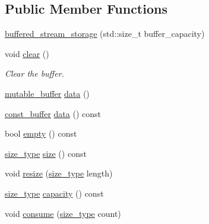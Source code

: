 \subsection*{Public Member Functions}
\begin{DoxyCompactItemize}
\item 
\hyperlink{classasio_1_1detail_1_1buffered__stream__storage_a8cfe52167d4f4ec4585f7e88debed158}{buffered\+\_\+stream\+\_\+storage} (std\+::size\+\_\+t buffer\+\_\+capacity)
\item 
void \hyperlink{classasio_1_1detail_1_1buffered__stream__storage_a5acab63f1e2af9413551a10674c68bae}{clear} ()
\begin{DoxyCompactList}\small\item\em Clear the buffer. \end{DoxyCompactList}\item 
\hyperlink{classasio_1_1mutable__buffer}{mutable\+\_\+buffer} \hyperlink{classasio_1_1detail_1_1buffered__stream__storage_a1a65a8411a4efc293849a9bce337127c}{data} ()
\item 
\hyperlink{classasio_1_1const__buffer}{const\+\_\+buffer} \hyperlink{classasio_1_1detail_1_1buffered__stream__storage_a9c56437a1a82f28986d7d39825d5f6b5}{data} () const 
\item 
bool \hyperlink{classasio_1_1detail_1_1buffered__stream__storage_ac69c8f2b10a085344a7101aff6d8ef9a}{empty} () const 
\item 
\hyperlink{classasio_1_1detail_1_1buffered__stream__storage_a1307072f53f7298ff9ce12e1d1f483cf}{size\+\_\+type} \hyperlink{classasio_1_1detail_1_1buffered__stream__storage_a7632d7344ae7a0a2dc623dc94c927bab}{size} () const 
\item 
void \hyperlink{classasio_1_1detail_1_1buffered__stream__storage_a7bf6aa249bd3aa1fbfec6804b07da9f3}{resize} (\hyperlink{classasio_1_1detail_1_1buffered__stream__storage_a1307072f53f7298ff9ce12e1d1f483cf}{size\+\_\+type} length)
\item 
\hyperlink{classasio_1_1detail_1_1buffered__stream__storage_a1307072f53f7298ff9ce12e1d1f483cf}{size\+\_\+type} \hyperlink{classasio_1_1detail_1_1buffered__stream__storage_abad838c1691005dcf8cfe0cd9134ee9c}{capacity} () const 
\item 
void \hyperlink{classasio_1_1detail_1_1buffered__stream__storage_ae7a23fe65eec4997f3366300a9b46303}{consume} (\hyperlink{classasio_1_1detail_1_1buffered__stream__storage_a1307072f53f7298ff9ce12e1d1f483cf}{size\+\_\+type} count)
\end{DoxyCompactItemize}


